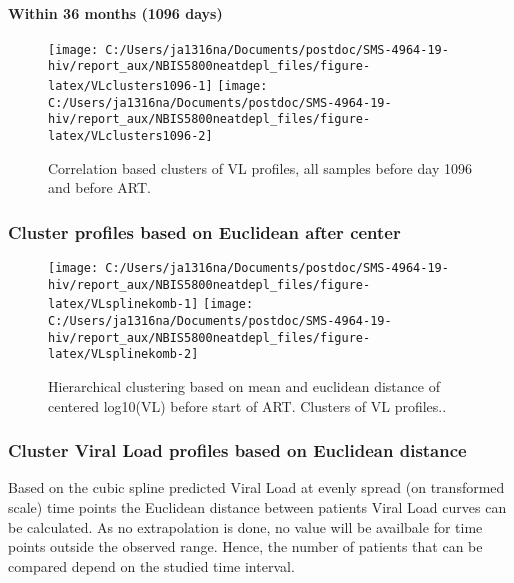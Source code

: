 \documentclass[
]{article}
\begin{document}
\hypertarget{within-36-months-1096-days}{%
\paragraph{Within 36 months (1096 days)}\label{within-36-months-1096-days}}

\begin{figure}
\texttt{[image: C:/Users/ja1316na/Documents/postdoc/SMS-4964-19-hiv/report\_aux/NBIS5800neatdepl\_files/figure-latex/VLclusters1096-1]} \texttt{[image: C:/Users/ja1316na/Documents/postdoc/SMS-4964-19-hiv/report\_aux/NBIS5800neatdepl\_files/figure-latex/VLclusters1096-2]} \caption{Correlation based clusters of VL profiles, all samples before day 1096 and before ART.}\label{fig:VLclusters1096}
\end{figure}

\hypertarget{cluster-profiles-based-on-euclidean-after-center}{%
\subsubsection{Cluster profiles based on Euclidean after center}\label{cluster-profiles-based-on-euclidean-after-center}}

\begin{figure}
\texttt{[image: C:/Users/ja1316na/Documents/postdoc/SMS-4964-19-hiv/report\_aux/NBIS5800neatdepl\_files/figure-latex/VLsplinekomb-1]} \texttt{[image: C:/Users/ja1316na/Documents/postdoc/SMS-4964-19-hiv/report\_aux/NBIS5800neatdepl\_files/figure-latex/VLsplinekomb-2]} \caption{Hierarchical clustering based on mean and euclidean distance of centered log10(VL) before start of ART. Clusters of VL profiles..}\label{fig:VLsplinekomb}
\end{figure}

\FloatBarrier

\hypertarget{cluster-viral-load-profiles-based-on-euclidean-distance}{%
\subsubsection{Cluster Viral Load profiles based on Euclidean distance}\label{cluster-viral-load-profiles-based-on-euclidean-distance}}

Based on the cubic spline predicted Viral Load at evenly spread (on transformed scale) time points the Euclidean distance between patients Viral Load curves can be calculated. As no extrapolation is done, no value will be availbale for time points outside the observed range. Hence, the number of patients that can be compared depend on the studied time interval.
\end{document}
